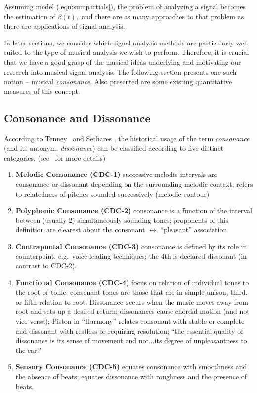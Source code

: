 Assuming model (\ref{eqn:sumpartials}), the problem of analyzing a signal
becomes the estimation of $\beta(t),$ and there are as many approaches
to that problem as there are applications of signal analysis.  

In later sections, we consider which signal analysis methods are
particularly well suited to the type of musical analysis we wish to
perform.  Therefore, it is crucial that we have a good grasp of the
musical ideas underlying and motivating our research into musical
signal analysis.  The following section presents one such notion --
musical \emph{consonance}.  Also presented are some existing
quantitative measures of this concept. 

\subsection{Consonance and Dissonance}
\label{sec:consonance}
According to Tenney~\cite{Tenney:1988} and Sethares
\cite{Sethares:1997}, the historical usage of the term {\it
consonance} (and its antonym, {\it dissonance}) can be classified
according to five distinct categories.
(see~\cite{Sethares:1997} for more details)
\begin{enumerate}
\item {\bf Melodic Consonance (CDC-1)} successive melodic intervals are
consonance or dissonant depending on the surrounding melodic context;
refers to relatedness of pitches sounded successively (melodic contour)
\item {\bf Polyphonic Consonance (CDC-2)} consonance is a function of
the interval between (usually 2) simultaneously sounding tones;
proponents of this definition are clearest about the consonant
$\leftrightarrow$ ``pleasant'' association.
\item {\bf Contrapuntal Consonance (CDC-3)} consonance is defined by
its role in counterpoint, e.g.~voice-leading techniques; the 4th is
declared dissonant (in contrast to CDC-2).
\item {\bf Functional Consonance (CDC-4)} focus on relation of
individual tones to the root or tonic; consonant tones are those that
are in simple unison, third, or fifth relation to root.  Dissonance
occurs when the music moves away from root and sets up a desired
return; dissonances cause chordal motion (and not vice-versa);  Piston
in ``Harmony'' relates consonant with stable or complete
and dissonant with restless or requiring resolution; ``the
essential quality of dissonance is its sense of movement and
not...its degree of unpleasantness to the ear.''
\item {\bf Sensory Consonance (CDC-5)}  equates consonance with
smoothness and the absence of beats; equates dissonance with roughness
and the presence of beats.
\end{enumerate}

